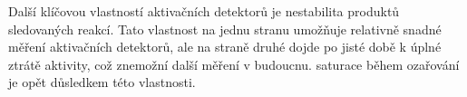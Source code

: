 Další klíčovou vlastností aktivačních detektorů je nestabilita produktů sledovaných reakcí. Tato vlastnost na jednu stranu umožňuje relativně snadné měření aktivačních detektorů, ale na straně druhé dojde po jisté době k úplné ztrátě aktivity, což znemožní další měření v budoucnu. \Gls{saturace} během ozařování je opět důsledkem této vlastnosti.
